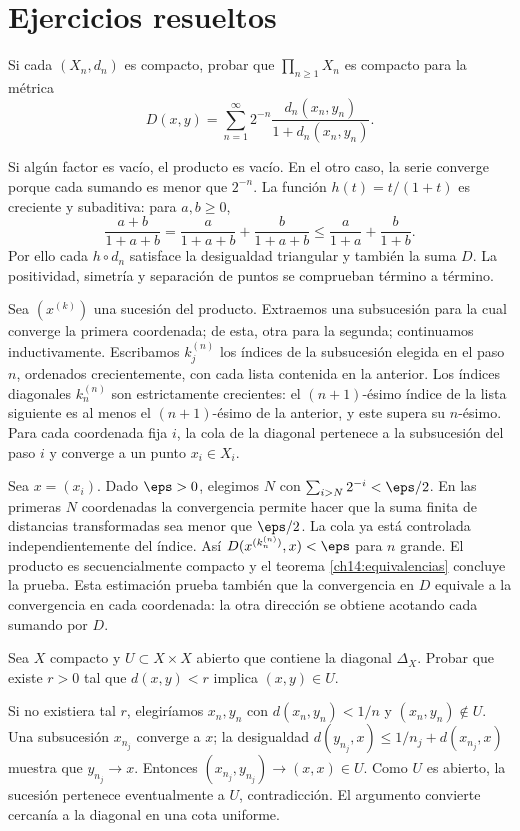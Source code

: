 \section{Ejercicios resueltos}
\begin{ejercicio}
Si cada $(X_n,d_n)$ es compacto, probar que $\prod_{n\ge1}X_n$ es compacto para la métrica
\[
D(x,y)=\sum_{n=1}^\infty 2^{-n}\frac{d_n(x_n,y_n)}{1+d_n(x_n,y_n)}.
\]
\end{ejercicio}
\begin{solucion}
Si algún factor es vacío, el producto es vacío. En el otro caso, la serie converge porque cada sumando es menor que $2^{-n}$. La función $h(t)=t/(1+t)$ es creciente y subaditiva: para $a,b\ge0$,
\[
\frac{a+b}{1+a+b}=\frac a{1+a+b}+\frac b{1+a+b}
\le\frac a{1+a}+\frac b{1+b}.
\]
Por ello cada $h\circ d_n$ satisface la desigualdad triangular y también la suma $D$. La positividad, simetría y separación de puntos se comprueban término a término.

Sea $(x^{(k)})$ una sucesión del producto. Extraemos una subsucesión para la cual converge la primera coordenada; de esta, otra para la segunda; continuamos inductivamente. Escribamos $k_j^{(n)}$ los índices de la subsucesión elegida en el paso $n$, ordenados crecientemente, con cada lista contenida en la anterior. Los índices diagonales $k_n^{(n)}$ son estrictamente crecientes: el $(n+1)$-ésimo índice de la lista siguiente es al menos el $(n+1)$-ésimo de la anterior, y este supera su $n$-ésimo. Para cada coordenada fija $i$, la cola de la diagonal pertenece a la subsucesión del paso $i$ y converge a un punto $x_i\in X_i$.

Sea $x=(x_i)$. Dado $\eps>0$, elegimos $N$ con $\sum_{i>N}2^{-i}<\eps/2$. En las primeras $N$ coordenadas la convergencia permite hacer que la suma finita de distancias transformadas sea menor que $\eps/2$. La cola ya está controlada independientemente del índice. Así $D(x^{(k_n^{(n)})},x)<\eps$ para $n$ grande. El producto es secuencialmente compacto y el teorema \ref{ch14:equivalencias} concluye la prueba. Esta estimación prueba también que la convergencia en $D$ equivale a la convergencia en cada coordenada: la otra dirección se obtiene acotando cada sumando por $D$.
\end{solucion}

\begin{ejercicio}
Sea $X$ compacto y $U\subset X\times X$ abierto que contiene la diagonal $\Delta_X$. Probar que existe $r>0$ tal que $d(x,y)<r$ implica $(x,y)\in U$.
\end{ejercicio}
\begin{solucion}
Si no existiera tal $r$, elegiríamos $x_n,y_n$ con $d(x_n,y_n)<1/n$ y $(x_n,y_n)\notin U$. Una subsucesión $x_{n_j}$ converge a $x$; la desigualdad $d(y_{n_j},x)\le1/n_j+d(x_{n_j},x)$ muestra que $y_{n_j}\to x$. Entonces $(x_{n_j},y_{n_j})\to(x,x)\in U$. Como $U$ es abierto, la sucesión pertenece eventualmente a $U$, contradicción. El argumento convierte cercanía a la diagonal en una cota uniforme.
\end{solucion}

